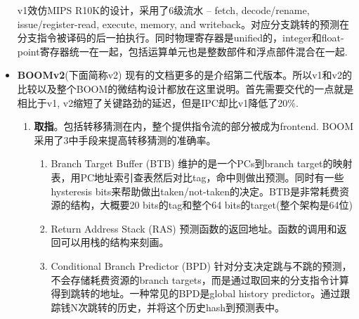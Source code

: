 \documentclass{article}
\begin{document}
\begin{multicols}{2}
\begin{itemize}
			v1效仿MIPS R10K的设计，采用了6级流水 -- fetch, decode/rename, issue/register-read, execute, memory, and writeback。对应分支跳转的预测在分支指令被译码的后一拍执行。同时物理寄存器是unified的，integer和float-point寄存器统一在一起，包括运算单元也是整数部件和浮点部件混合在一起.~\cite{Celio:EECS-2017-157}
			\item \textbf{BOOMv2}(下面简称v2)
			现有的文档更多的是介绍第二代版本。所以v1和v2的比较以及整个BOOM的微结构设计都放在这里说明。首先需要交代的一点就是相比于v1, v2缩短了关键路劲的延迟，但是IPC却比v1降低了20\%.~\cite{Celio:EECS-2017-157}
			\begin{enumerate}
				\item \textbf{取指}。包括转移猜测在内，整个提供指令流的部分被成为frontend. BOOM采用了3中手段来提高转移猜测的准确率。
				\begin{enumerate}
					\item Branch Target Buffer (BTB) 维护的是一个PCs到branch target的映射表，用PC地址索引查表然后对比tag，命中则做出预测。同时有一些hysteresis bits来帮助做出taken/not-taken的决定。BTB是非常耗费资源的结构，大概要20 bits的tag和整个64 bits的target(整个架构是64位)
					\item Return Address Stack (RAS) 预测函数的返回地址。函数的调用和返回可以用栈的结构来刻画。
					\item Conditional Branch Predictor (BPD) 针对分支决定跳与不跳的预测，不会存储耗费资源的branch targets，而是通过取回来的分支指令计算得到跳转的地址。一种常见的BPD是global history predictor。通过跟踪钱N次跳转的历史，并将这个历史hash到预测表中。
				\end{enumerate}
			\begin{figure}[H]

\end{figure}
\end{enumerate}
\end{itemize}
\end{multicols}
\end{document}
